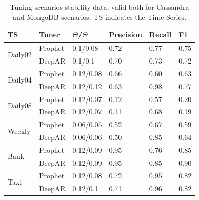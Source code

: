 \documentclass[a4paper, 12pt]{article} %
\newcommand{\ra}[1]{\renewcommand{\arraystretch}{#1}}
\begin{document}
	\begin{table}\centering 
		\ra{1.3}
		\begin{tabularx}{\textwidth}{@{}XXXXXX@{}}
			\toprule
			TS & Tuner & $\Theta$/$\tilde{\Theta}$ & Precision & Recall& F1\\
			
			\midrule
			\multirow{2}{*}{Daily02}
			&Prophet & 0.1/0.08 & 0.72 & 0.77 & 0.75 \\
			&DeepAR & 0.1/0.1 & 0.70 & 0.73 & 0.72\\
			
			\midrule
			\multirow{2}{*}{Daily04}
			&Prophet & 0.12/0.08 & 0.66 & 0.60 & 0.63\\
			&DeepAR & 0.12/0.12 & 0.63 & 0.98 & 0.77\\
			
			\midrule
			\multirow{2}{*}{Daily08}
			&Prophet & 0.12/0.07 & 0.12 & 0.57 & 0.20 \\
			&DeepAR & 0.12/0.07 & 0.11 & 0.68 & 0.19\\
			
			\midrule
			\multirow{2}{*}{Weekly}
			&Prophet & 0.06/0.05 & 0.52 & 0.67 & 0.59\\
			&DeepAR & 0.06/0.06 & 0.50 & 0.85 & 0.64\\
			
			\midrule
			\multirow{2}{*}{Bank}
			&Prophet & 0.12/0.09 & 0.95 & 0.76 & 0.85\\
			&DeepAR & 0.12/0.09 & 0.95 & 0.85 & 0.90 \\
			
			\midrule
			\multirow{2}{*}{Taxi}
			&Prophet & 0.12/0.08 & 0.72 & 0.95 & 0.82 \\
			&DeepAR & 0.12/0.1 & 0.71 & 0.96 & 0.82\\
			
			\bottomrule
		\end{tabularx}
		\caption{Tuning scenarios stability data, valid both for Cassandra and MongoDB scenarios. TS indicates the Time Series.} \label{table:results_stability}
	\end{table}
	
\end{document}
